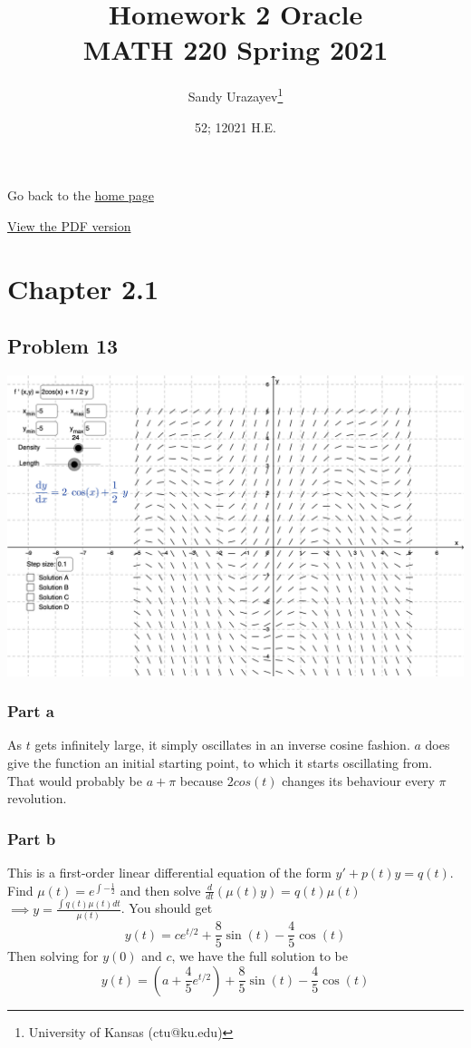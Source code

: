 \documentclass[12pt]{article}
\author{Sandy Urazayev\thanks{University of Kansas (ctu@ku.edu)}}
\date{52; 12021 H.E.}
\title{Homework 2 Oracle\\\medskip
\large MATH 220 Spring 2021}
\begin{document}
\maketitle
Go back to the \href{../../}{home page}

\href{./index.pdf}{View the PDF version​}

\section*{Chapter 2.1}
\label{sec:org9c6164d}
\subsection*{Problem 13}
\label{sec:org6c8f49d}
\begin{center}
\includegraphics[width=.9\linewidth]{./13.png}
\end{center}
\subsubsection*{Part a}
\label{sec:orgae05c1a}
As \(t\) gets infinitely large, it simply oscillates in an inverse cosine
fashion. \(a\) does give the function an initial starting point, to which it
starts oscillating from. That would probably be \(a + \pi\) because
\(2cos(t)\) changes its behaviour every \(\pi\) revolution.
\subsubsection*{Part b}
\label{sec:orgc3b8438}
This is a first-order linear differential equation
of the form \(y' + p(t) y = q(t)\). Find
\(\mu(t) = e^{\int{-\frac{1}{2}}}\) and then solve \(\frac{d}{dt}(\mu(t)y) = q(t) \mu(t)\)
\(\implies y = \frac{\int q(t) \mu(t) dt}{\mu(t)}\). You should get
\begin{equation*}
        y(t) = ce^{t/2}+\frac{8}{5}\sin(t)-\frac{4}{5}\cos(t)
\end{equation*}
Then solving for \(y(0)\) and \(c\), we have the full solution to be
\begin{equation*}
        y(t) = (a+\frac{4}{5}e^{t/2})+\frac{8}{5}\sin(t)-\frac{4}{5}\cos(t)
\end{equation*}
\end{document}
